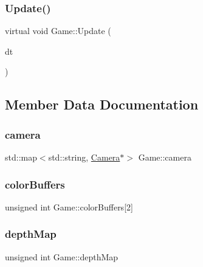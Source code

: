 \mbox{\label{class_game_a4b30da80605844abc5fb07e732b85b39}} 
\subsubsection{\texorpdfstring{Update()}{Update()}}
{\footnotesize\ttfamily virtual void Game\+::\+Update (\begin{DoxyParamCaption}\item[{G\+Lfloat}]{dt }\end{DoxyParamCaption})\hspace{0.3cm}{\ttfamily [pure virtual]}}



\subsection{Member Data Documentation}
\mbox{\label{class_game_af4eb1b9c217dcb0f860ec9b0320f2274}} 
\subsubsection{\texorpdfstring{camera}{camera}}
{\footnotesize\ttfamily std\+::map$<$std\+::string, \mbox{\hyperlink{class_camera}{Camera}}$\ast$$>$ Game\+::camera}

\mbox{\label{class_game_af6b4374237efc5ae2586dd1b2a0304f3}} 
\subsubsection{\texorpdfstring{colorBuffers}{colorBuffers}}
{\footnotesize\ttfamily unsigned int Game\+::color\+Buffers\mbox{[}2\mbox{]}\hspace{0.3cm}{\ttfamily [protected]}}

\mbox{\label{class_game_a61853261d678bcfe2638deba1e58fd18}} 
\subsubsection{\texorpdfstring{depthMap}{depthMap}}
{\footnotesize\ttfamily unsigned int Game\+::depth\+Map\hspace{0.3cm}{\ttfamily [protected]}}

